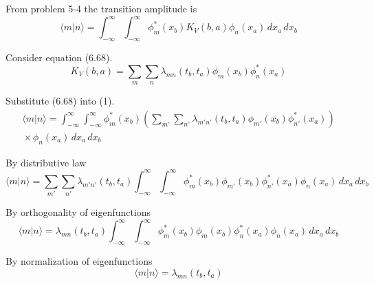 


\bigskip
From problem 5-4 the transition amplitude is
\begin{equation*}
\langle m|n\rangle=
\int_{-\infty}^\infty\int_{-\infty}^\infty
\phi_m^*(x_b)K_V(b,a)\phi_n(x_a)
\,dx_a\,dx_b
\tag{1}
\end{equation*}

Consider equation (6.68).
\begin{equation*}
K_V(b,a)=\sum_m\sum_n\lambda_{mn}(t_b,t_a)\phi_m(x_b)\phi_n^*(x_a)
\tag{6.68}
\end{equation*}

Substitute (6.68) into (1).
\begin{multline*}
\langle m|n\rangle=
\int_{-\infty}^\infty\int_{-\infty}^\infty
\phi_m^*(x_b)
\left(\sum_{m'}\sum_{n'}\lambda_{m'n'}(t_b,t_a)\phi_{m'}(x_b)\phi_{n'}^*(x_a)\right)
\\
{}\times
\phi_n(x_a)
\,dx_a\,dx_b
\end{multline*}

By distributive law
\begin{equation*}
\langle m|n\rangle=
\sum_{m'}\sum_{n'}\lambda_{m'n'}(t_b,t_a)
\int_{-\infty}^\infty\int_{-\infty}^\infty
\phi_m^*(x_b)\phi_{m'}(x_b)
\phi_{n'}^*(x_a)\phi_n(x_a)
\,dx_a\,dx_b
\end{equation*}

By orthogonality of eigenfunctions
\begin{equation*}
\langle m|n\rangle=
\lambda_{mn}(t_b,t_a)\int_{-\infty}^\infty\int_{-\infty}^\infty
\phi_m^*(x_b)\phi_m(x_b)
\phi_n^*(x_a)\phi_n(x_a)
\,dx_a\,dx_b
\end{equation*}

By normalization of eigenfunctions
\begin{equation*}
\langle m|n\rangle=
\lambda_{mn}(t_b,t_a)
\end{equation*}


